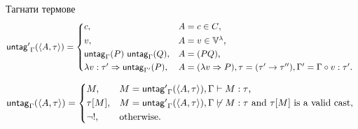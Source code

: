\documentclass[9pt]{beamer}
\begin{document}
  \begin{frame}{Тагнати термове}
    \[
        \mcf{untag'}_{\Gamma}(\ttt{A}{\tau}) =
        \begin{cases*}
            c ,& $A = c \in C$, \\
            v ,& $A = v \in \lvars$, \\
            \mcf{untag}_{\Gamma}(P) \app \mcf{untag}_{\Gamma}(Q)
 ,& $A = (PQ)$, \\
            \lambda v : \tau' \abstr \mcf{untag}_{\Gamma'}(P)
 ,& $A = (\lambda v \abstr P), \tau = (\tau' \tot \tau'')
                 , \Gamma' = \Gamma \circ v : \tau'$. \\
        \end{cases*}
    \]

    \[
        \mcf{untag}_{\Gamma}(\ttt{A}{\tau}) =
        \begin{cases*}
            M ,& $M = \mcf{untag'}_{\Gamma}(\ttt{A}{\tau}), \Gamma \vdash M : \tau$, \\
            \tau[M] ,& $M = \mcf{untag'}_{\Gamma}(\ttt{A}{\tau}), \Gamma \not\vdash M : \tau
            \text{ and } \tau[M] \text { is a valid cast}
            $, \\
            \neg ! ,& \text{otherwise}.
        \end{cases*}
    \]
  \end{frame}
\end{document}
